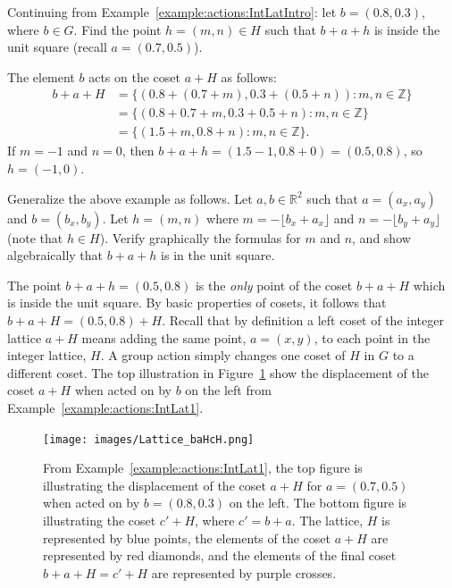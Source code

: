 \begin{example}\label{example:actions:IntLat1} Continuing from Example~\ref{example:actions:IntLatIntro}: let $b=(0.8,0.3)$, where $b \in G$. Find the point $h=(m,n) \in H$ such that $b+a+h$ is inside the unit square (recall $a=(0.7,0.5)$).

The element $b$ acts on the coset $a+H$ as follows:  
\begin{align*}
 b+a+H &=\{(0.8+(0.7+m), 0.3+(0.5+n)):m, n \in \mathbb{Z}\}\\
&=\{(0.8+0.7+m, 0.3+0.5+n):m, n \in \mathbb{Z}\}\\
&=\{(1.5+m, 0.8+n):m, n \in \mathbb{Z}\}. 
\end{align*}
If $m=-1$ and $n=0$, then $b+a+h=(1.5-1,0.8+0)=(0.5,0.8)$, so $h=(-1,0)$.
\end{example}

\begin{exercise}\label{exercise:actions:floorh} Generalize the above example as follows. Let $a,b \in \mathbb{R}^2$ such that $a=(a_x,a_y)$ and $b=(b_x,b_y)$. Let $h=(m,n)$ where $m=-\lfloor b_x+a_x \rfloor$ and $n=-\lfloor b_y+a_y \rfloor$ (note that $h \in H$). Verify graphically the formulas for $m$ and $n$, and show algebraically that $b+a+h$ is in the unit square.
\end{exercise}

The point $b+a+h=(0.5,0.8)$ is the \emph{only} point of the coset $b+a+H$ which is inside the unit square. By basic properties of cosets, it follows that $b+a+H =(0.5, 0.8)+H$. Recall that by definition a left coset of the integer lattice $a+H$ means adding the same point, $a=(x,y)$, to each point in the integer lattice, $H$. A group action simply changes one coset of $H$ in $G$ to a different coset.  The top illustration in Figure~\ref{fig:IntegerLattice1} show the displacement of the coset $a+H$ when acted on by $b$ on the left from Example~\ref{example:actions:IntLat1}. 

\begin{figure}[htpb]
\begin{center}
\texttt{[image: images/Lattice\_baHcH.png]}
\caption{From Example~\ref{example:actions:IntLat1}, the top figure is illustrating the displacement of the coset $a+H$ for $a=(0.7,0.5)$ when acted on by $b=(0.8,0.3)$ on the left. The bottom figure is illustrating the coset $c'+H$, where $c'=b+a$. The lattice, $H$ is represented by blue points, the elements of the coset $a+H$ are represented by red diamonds, and the elements of the final coset $b+a+H=c'+H$ are represented by purple crosses.}
\label{fig:IntegerLattice1}
\end{center}
\end{figure}

